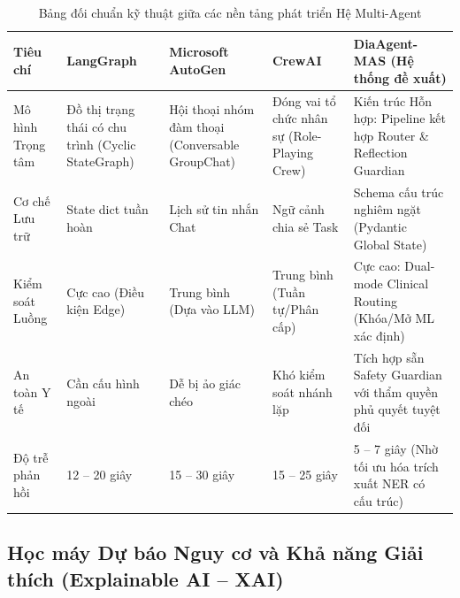 \documentclass[12pt,a4paper]{article}
\begin{document}
\begin{table}[H]
\centering
\footnotesize
\caption{Bảng đối chuẩn kỹ thuật giữa các nền tảng phát triển Hệ Multi-Agent}
\label{tab:mas_frameworks}
\begin{tabularx}{\textwidth}{@{} l Y Y Y Y @{}}
\toprule
\textbf{Tiêu chí} & \textbf{LangGraph} & \textbf{Microsoft AutoGen} & \textbf{CrewAI} & \textbf{DiaAgent-MAS (Hệ thống đề xuất)} \\
\midrule
Mô hình Trọng tâm & Đồ thị trạng thái có chu trình (Cyclic StateGraph) & Hội thoại nhóm đàm thoại (Conversable GroupChat) & Đóng vai tổ chức nhân sự (Role-Playing Crew) & Kiến trúc Hỗn hợp: Pipeline kết hợp Router \& Reflection Guardian \\
Cơ chế Lưu trữ & State dict tuần hoàn & Lịch sử tin nhắn Chat & Ngữ cảnh chia sẻ Task & Schema cấu trúc nghiêm ngặt (Pydantic Global State) \\
Kiểm soát Luồng & Cực cao (Điều kiện Edge) & Trung bình (Dựa vào LLM) & Trung bình (Tuần tự/Phân cấp) & Cực cao: Dual-mode Clinical Routing (Khóa/Mở ML xác định) \\
An toàn Y tế & Cần cấu hình ngoài & Dễ bị ảo giác chéo & Khó kiểm soát nhánh lặp & Tích hợp sẵn Safety Guardian với thẩm quyền phủ quyết tuyệt đối \\
Độ trễ phản hồi & 12 -- 20 giây & 15 -- 30 giây & 15 -- 25 giây & 5 -- 7 giây (Nhờ tối ưu hóa trích xuất NER có cấu trúc) \\
\bottomrule
\end{tabularx}
\end{table}

\subsection{Học máy Dự báo Nguy cơ và Khả năng Giải thích (Explainable AI -- XAI)}
\end{document}
